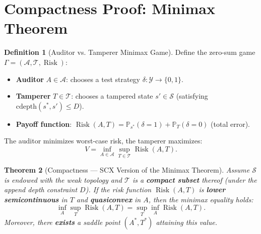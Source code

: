\documentclass[12pt,a4paper]{article}
\theoremstyle{plain}
\newtheorem{theorem}{Theorem}[section]
\theoremstyle{definition}
\newtheorem{definition}[theorem]{Definition}
\DeclareMathOperator{\Risk}{Risk}
\begin{document}
\section{Compactness Proof: Minimax Theorem}
\label{sec:minimax}

\begin{definition}[Auditor vs. Tamperer Minimax Game]
\label{def:minimax_game}
Define the zero-sum game $\Gamma = (\mathcal{A}, \mathcal{T}, \Risk)$:
\begin{itemize}
    \item \textbf{Auditor} $A \in \mathcal{A}$: chooses a test strategy $\delta: \mathcal{Y} \to \{0,1\}$.
    \item \textbf{Tamperer} $T \in \mathcal{T}$: chooses a tampered state $s' \in \mathcal{S}$ (satisfying $\text{cdepth}(s^*, s') \leq D$).
    \item \textbf{Payoff function}: $\Risk(A, T) = \mathbb{P}_{s^*}(\delta=1) + \mathbb{P}_{T}(\delta=0)$ (total error).
\end{itemize}
The auditor minimizes worst-case risk, the tamperer maximizes:
\begin{equation}\label{eq:minimax}
V = \inf_{A \in \mathcal{A}} \sup_{T \in \mathcal{T}} \Risk(A, T).
\end{equation}
\end{definition}

\begin{theorem}[Compactness --- SCX Version of the Minimax Theorem]
\label{thm:compactness}
Assume $\mathcal{S}$ is endowed with the weak topology and $\mathcal{T}$ is a \textbf{compact subset} thereof (under the append depth constraint $D$).
If the risk function $\Risk(A, T)$ is \textbf{lower semicontinuous} in $T$ and \textbf{quasiconvex} in $A$,
then the minimax equality holds:
\begin{equation}\label{eq:minimax_eq}
\inf_{A} \sup_{T} \Risk(A, T) = \sup_{T} \inf_{A} \Risk(A, T).
\end{equation}
Moreover, there \textbf{exists} a saddle point $(A^*, T^*)$ attaining this value.
\end{theorem}
\end{document}
